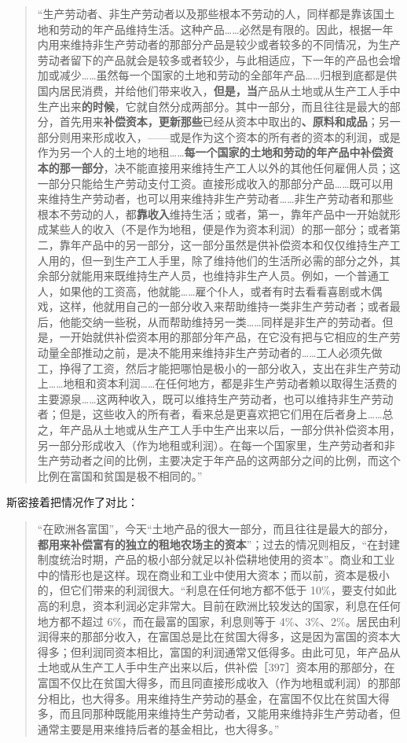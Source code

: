 \begin{quote}“生产劳动者、非生产劳动者以及那些根本不劳动的人，同样都是靠该国土地和劳动的年产品维持生活。这种产品……必然是有限的。因此，根据一年内用来维持非生产劳动者的那部分产品是较少或者较多的不同情况，为生产劳动者留下的产品就会是较多或者较少，与此相适应，下一年的产品也会增加或减少……虽然每一个国家的土地和劳动的全部年产品……归根到底都是供国内居民消费，并给他们带来收入，\textbf{但是，当}产品从土地或从生产工人手中生产出来\textbf{的时候}，它就自然分成两部分。其中一部分，而且往往是最大的部分，首先用来\textbf{补偿资本，更新那些}已经从资本中取出的\textbf{、原料和成品}；另一部分则用来形成收入，——或是作为这个资本的所有者的资本的利润，或是作为另一个人的土地的地租……\textbf{每一个国家的土地和劳动的年产品中补偿资本的那一部分}，决不能直接用来维持生产工人以外的其他任何雇佣人员；这一部分只能给生产劳动支付工资。直接形成收入的那部分产品……既可以用来维持生产劳动者，也可以用来维持非生产劳动者……非生产劳动者和那些根本不劳动的人，都\textbf{靠收入}维持生活；或者，第一，靠年产品中一开始就形成某些人的收入（不是作为地租，便是作为资本利润）的那一部分；或者第二，靠年产品中的另一部分，这一部分虽然是供补偿资本和仅仅维持生产工人用的，但一到生产工人手里，除了维持他们的生活所必需的部分之外，其余部分就能用来既维持生产人员，也维持非生产人员。例如，一个普通工人，如果他的工资高，他就能……雇个仆人，或者有时去看看喜剧或木偶戏，这样，他就用自己的一部分收入来帮助维持一类非生产劳动者；或者最后，他能交纳一些税，从而帮助维持另一类……同样是非生产的劳动者。但是，一开始就供补偿资本用的那部分年产品，在它没有把与它相应的生产劳动量全部推动之前，是决不能用来维持非生产劳动者的……工人必须先做工，挣得了工资，然后才能把哪怕是极小的一部分收入，支出在非生产劳动上……地租和资本利润……在任何地方，都是非生产劳动者赖以取得生活费的主要源泉……这两种收入，既可以维持生产劳动者，也可以维持非生产劳动者；但是，这些收入的所有者，看来总是更喜欢把它们用在后者身上……总之，年产品从土地或从生产工人手中生产出来以后，一部分供补偿资本用，另一部分形成收入（作为地租或利润）。在每一个国家里，生产劳动者和非生产劳动者之间的比例，主要决定于年产品的这两部分之间的比例，而这个比例在富国和贫国是极不相同的。”\end{quote}

斯密接着把情况作了对比：

\begin{quote}“在欧洲各富国”，今天“土地产品的很大一部分，而且往往是最大的部分，\textbf{都用来补偿富有的独立的租地农场主的资本}”；过去的情况则相反，“在封建制度统治时期，产品的极小部分就足以补偿耕地使用的资本”。商业和工业中的情形也是这样。现在商业和工业中使用大资本；而以前，资本是极小的，但它们带来的利润很大。“利息在任何地方都不低于 10\%，要支付如此高的利息，资本利润必定非常大。目前在欧洲比较发达的国家，利息在任何地方都不超过 6\%，而在最富的国家，利息则等于 4\%、3\%、2\%。居民由利润得来的那部分收入，在富国总是比在贫国大得多，这是因为富国的资本大得多；但利润同资本相比，富国的利润通常又低得多。由此可见，年产品从土地或从生产工人手中生产出来以后，供补偿［397］资本用的那部分，在富国不仅比在贫国大得多，而且同直接形成收入（作为地租或利润）的那部分相比，也大得多。用来维持生产劳动的基金，在富国不仅比在贫国大得多，而且同那种既能用来维持生产劳动者，又能用来维持非生产劳动者，但通常主要是用来维持后者的基金相比，也大得多。”\end{quote}

